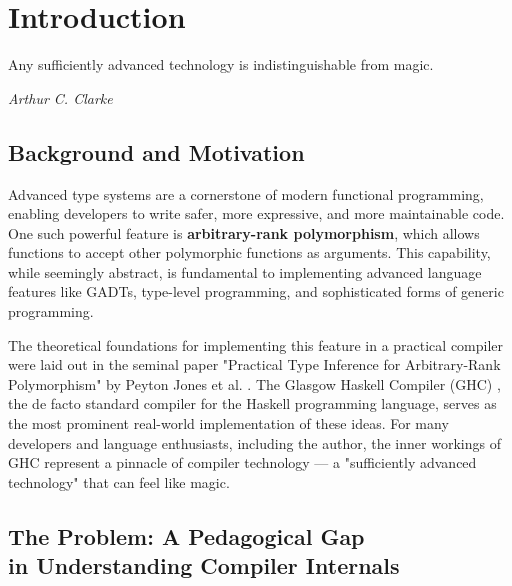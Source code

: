 \chapter{Introduction}
\label{chap:Introduction}

\epigraph{Any sufficiently advanced technology is indistinguishable from magic.}{\textit{Arthur C. Clarke}}

\section{Background and Motivation}

Advanced type systems are a cornerstone of modern functional programming, enabling developers to write safer, more expressive, and more maintainable code. One such powerful feature is \textbf{arbitrary-rank polymorphism}, which allows functions to accept other polymorphic functions as arguments. This capability, while seemingly abstract, is fundamental to implementing advanced language features like GADTs, type-level programming, and sophisticated forms of generic programming.

The theoretical foundations for implementing this feature in a practical compiler were laid out in the seminal paper "Practical Type Inference for Arbitrary-Rank Polymorphism" by Peyton Jones et al. \cite{jones-practical-2007}. The Glasgow Haskell Compiler (GHC) \cite{ghc-site-2025}, the de facto standard compiler for the Haskell programming language, serves as the most prominent real-world implementation of these ideas. For many developers and language enthusiasts, including the author, the inner workings of GHC represent a pinnacle of compiler technology --- a "sufficiently advanced technology" that can feel like magic.

\section[The Problem: A Pedagogical Gap in Understanding Compiler Internals]{The Problem: A Pedagogical Gap \\ in Understanding Compiler Internals}

